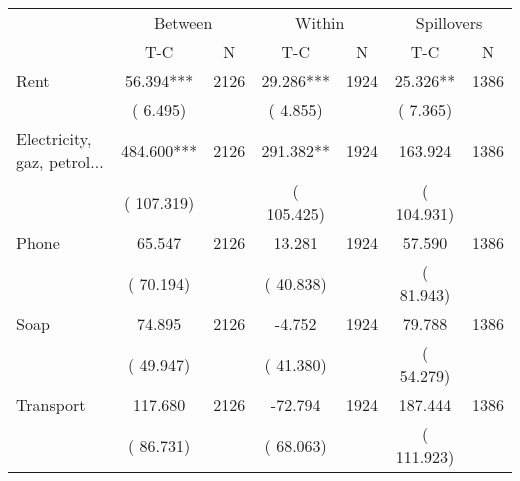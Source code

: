 
\begin{tabular}{l*{6}{c}}\hline&\multicolumn{2}{c}{Between}&\multicolumn{2}{c}{Within}&\multicolumn{2}{c}{Spillovers} \\ \cmidrule(r){2-3}\cmidrule(l){4-5}\cmidrule(l){6-7} & {T-C} & {N} & {T-C} & {N}  & {T-C}  & {N}  \\ \midrule
Rent        &             56.394***      &       2126       &             29.286***      &       1924       &             25.326**      &       1386       \\
                       &       (       6.495)            &                               &       (       4.855)            &                               &       (       7.365)            &                               \\
Electricity, gaz, petrol...        &            484.600***      &       2126       &            291.382**      &       1924       &            163.924      &       1386       \\
                       &       (     107.319)            &                               &       (     105.425)            &                               &       (     104.931)            &                               \\
Phone        &             65.547      &       2126       &             13.281      &       1924       &             57.590      &       1386       \\
                       &       (      70.194)            &                               &       (      40.838)            &                               &       (      81.943)            &                               \\
Soap        &             74.895      &       2126       &             -4.752      &       1924       &             79.788      &       1386       \\
                       &       (      49.947)            &                               &       (      41.380)            &                               &       (      54.279)            &                               \\
Transport        &            117.680      &       2126       &            -72.794      &       1924       &            187.444      &       1386       \\
                       &       (      86.731)            &                               &       (      68.063)            &                               &       (     111.923)            &                               \\

\end{tabular}
